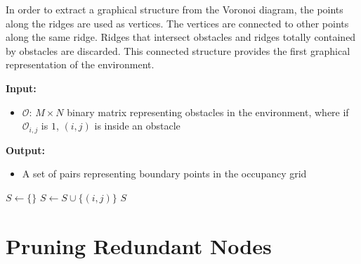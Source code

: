\documentclass[letterpaper, 10pt, conference]{ieeeconf}
\renewcommand{\algorithmicrequire}{\textbf{Input:}}
\renewcommand{\algorithmicensure}{\textbf{Output:}}
\newcommand{\Function}[1]{\ensuremath{{ \textsc{#1}}}}
\begin{document}
In order to extract a graphical structure from the Voronoi diagram, the points
along the ridges are used as vertices. The vertices are connected to other
points along the same ridge. Ridges that intersect obstacles and ridges totally
contained by obstacles are discarded. This connected structure provides the
first graphical representation of the environment.


\begin{algorithm}
    \caption{$\Function{BoundaryPoints}(\mathcal{O})$}
    \algorithmicrequire{
        \begin{itemize}
            \item $\mathcal{O}$: $M \times N$ binary matrix representing
                obstacles in the environment, where if $\mathcal{O}_{i, j}$ is
                $1$, $(i, j)$ is inside an obstacle
        \end{itemize}}
    \algorithmicensure{
        \begin{itemize}
            \item A set of pairs representing boundary points in the
                occupancy grid
        \end{itemize}}

    \label{algo:boundary}
    \begin{algorithmic}[1]
        \setcounter{ALC@line}{0}
        \vspace*{1mm}
        \STATE $S \leftarrow \{\}$
                                \STATE $S \leftarrow S \cup \{(i, j)\}$
                            \ENDIF
                        \ENDFOR
                    \ENDFOR
                \ENDIF
            \ENDFOR
        \ENDFOR
        \RETURN $S$
    \end{algorithmic}
\end{algorithm}

\section{Pruning Redundant Nodes}
\end{document}
